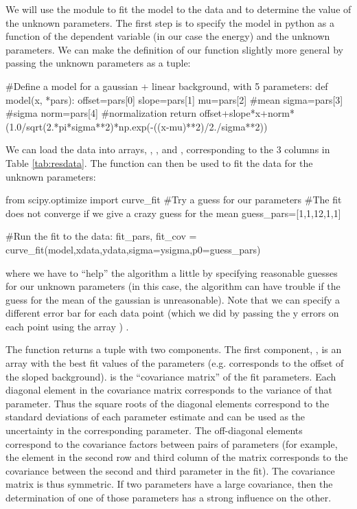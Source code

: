 We will use the  module to fit the model to the data and to determine the value of the unknown parameters. The first step is to specify the model in python as a function of the dependent variable (in our case the energy) and the unknown parameters. We can make the definition of our function slightly more general by passing the unknown parameters as a tuple:
\begin{python}[caption = Defining a function for a non-linear fit] 
#Define a model for a gaussian + linear background, with 5 parameters:
def model(x, *pars):
    offset=pars[0]
    slope=pars[1]
    mu=pars[2] #mean
    sigma=pars[3] #sigma
    norm=pars[4] #normalization
    return offset+slope*x+norm*(1.0/sqrt(2.*pi*sigma**2)*np.exp(-((x-mu)**2)/2./sigma**2))
\end{python}
We can load the data into arrays, , , and , corresponding to the 3 columns in Table \ref{tab:resdata}. The  function can then be used to fit the data for the unknown parameters:
\begin{python}[caption = Non-linear fit in python] 
from scipy.optimize import curve_fit 
#Try a guess for our parameters
#The fit does not converge if we give a crazy guess for the mean
guess_pars=[1,1,12,1,1]

#Run the fit to the data:
fit_pars, fit_cov = curve_fit(model,xdata,ydata,sigma=ysigma,p0=guess_pars)
\end{python}
where we have to ``help'' the algorithm a little by specifying reasonable guesses for our unknown parameters (in this case, the algorithm can have trouble if the guess for the mean of the gaussian is unreasonable). Note that we can specify a different error bar for each data point (which we did by passing the y errors on each point using the array ) . 

The  function returns a tuple with two components. The first component, , is an array with the best fit values of the parameters (e.g.  corresponds to the offset of the sloped background).  is the ``covariance matrix'' of the fit parameters. Each diagonal element in the covariance matrix corresponds to the variance of that parameter. Thus the square roots of the diagonal elements correspond to the standard deviations of each parameter estimate and can be used as the uncertainty in the corresponding parameter. The off-diagonal elements correspond to the covariance factors between pairs of parameters (for example, the element in the second row and third column of the matrix corresponds to the covariance between the second and third parameter in the fit). The covariance matrix is thus symmetric. If two parameters have a large covariance, then the determination of one of those parameters has a strong influence on the other. 

